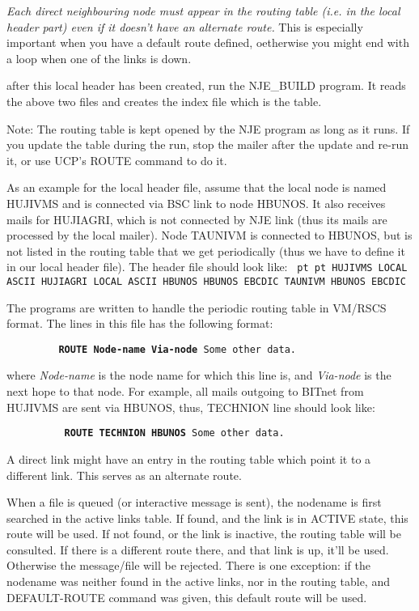 {\it Each direct neighbouring node {\ncrBold must} appear in the routing
table (i.e. in the local header part) even if it doesn't have an alternate
route.} This is especially important when you have a default route defined,
oetherwise you might end with a loop when one of the links is down.

after this local header has been created, run the {\ncrBold NJE\_BUILD}
 program.
It reads the above two files and creates the index  file  which  is  the
table.

{\ncrBold Note:}
 The routing table is kept opened by the NJE program as long as it
runs. If you update the table during the run, stop the mailer after  the
update and re-run it, or use UCP's ROUTE command to do it.

As  an  example for the local header file, assume that the local node
is named HUJIVMS and is connected via BSC link to node HBUNOS.  It  also
receives  mails  for  HUJIAGRI, which is not connected by NJE link (thus
its mails are processed by the local mailer). Node TAUNIVM is  connected
to  HBUNOS,  but  is  not  listed  in  the  routing  table  that  we get
periodically (thus we have to define it in our local header  file).  The
header file should look like:
{\hfill\break\obeylines\obeyspaces\tt{} pt  pt
HUJIVMS     LOCAL     ASCII
HUJIAGRI    LOCAL     ASCII
HBUNOS      HBUNOS    EBCDIC
TAUNIVM     HBUNOS    EBCDIC
}

The  programs  are  written  to  handle the periodic routing table in
VM/RSCS format. The lines in this file has the following format:

{\tt{\bf ~~~~~~~~~ROUTE   Node-name   Via-node}   {\ncr Some other data.}}

where {\sl Node-name} is the node name for which this line is, and
{\sl Via-node}
is the next hope to that node. For example, all mails outgoing to BITnet
from HUJIVMS are sent via HBUNOS, thus, TECHNION line should look like:

{\tt{\bf ~~~~~~~~~~ROUTE   TECHNION   HBUNOS}   \ncr Some other data.}

\vfill\eject


A direct link might have an entry in the routing table which point it
to a different link. This serves as an alternate route.

When  a file is queued (or interactive message is sent), the nodename
is first searched in the active links table. If found, and the  link  is
in  ACTIVE  state, this route will be used. If not found, or the link is
inactive, the routing table will be consulted. If there is  a  different
route  there,  and  that  link  is  up,  it'll  be  used.  Otherwise the
message/file will be rejected. There is one exception: if  the  nodename
was  neither  found  in  the active links, nor in the routing table, and
DEFAULT-ROUTE command was given, this default route will be used.

